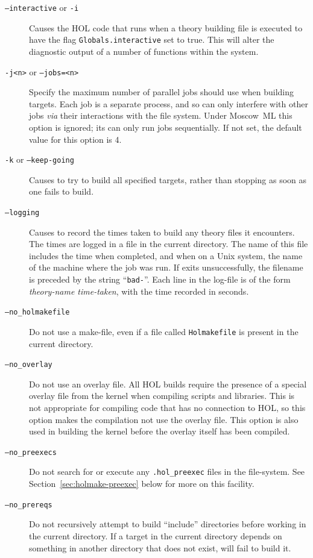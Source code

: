 \begin{description}
\item[\texttt{--interactive} or \texttt{-i}] Causes the HOL code that
  runs when a theory building file is executed to have the flag
  \texttt{Globals.interactive} set to true.  This will alter the diagnostic
  output of a number of functions within the system.
\item[\texttt{-j<n>} or \texttt{--jobs=<n>}] Specify the maximum number of parallel jobs \holmake{} should use when building targets.
  Each job is a separate process, and so can only interfere with other jobs \emph{via} their interactions with the file system.
  Under Moscow~ML this option is ignored; its \holmake{} can only run jobs sequentially.
  If not set, the default value for this option is 4.
\item[\texttt{-k} or \texttt{--keep-going}] Causes \holmake{} to try
  to build all specified targets, rather than stopping as soon as one
  fails to build.
\item[\texttt{--logging}] Causes \holmake{} to record the times taken
  to build any theory files it encounters.  The times are logged in a
  file in the current directory.  The name of this file includes the
  time when \holmake{} completed, and when on a Unix system, the name
  of the machine where the job was run.  If \holmake{} exits
  unsuccessfully, the filename is preceded by the string
  ``\texttt{bad-}''. Each line in the log-file is of the form
  \textit{theory-name time-taken}, with the time recorded in seconds.
\item[\texttt{--no\_holmakefile}]  Do not use a make-file, even if a file
  called \texttt{Holmakefile} is present in the current directory.
\item[\texttt{--no\_overlay}] Do not use an overlay file.  All HOL
  builds require the presence of a special overlay file from the
  kernel when compiling scripts and libraries.  This is not
  appropriate for compiling code that has no connection to HOL, so
  this option makes the compilation not use the overlay file.  This
  option is also used in building the kernel before the overlay itself
  has been compiled.
\item[\texttt{--no\_preexecs}] Do not search for or execute any \texttt{.hol\_preexec} files in the file-system.
See Section~\ref{sec:holmake-preexec} below for more on this facility.
\item[\texttt{--no\_prereqs}]%
%
Do not recursively attempt to build ``include'' directories before working in the current directory.
If a target in the current directory depends on something in another directory that does not exist, \holmake{} will fail to build it.

\end{description}
